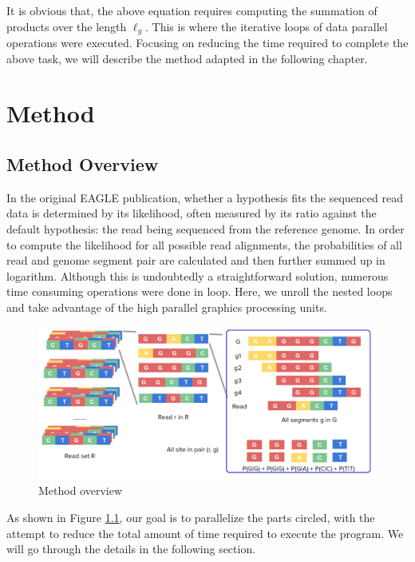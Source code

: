 \documentclass{PHlab-thesis}
\begin{document}
It is obvious that, the above equation requires computing the summation of products over the length $\ell_g$. This is where the iterative loops of data parallel operations were executed. Focusing on reducing the time required to complete the above task, we will describe the method adapted in the following chapter.

\chapter{Method}
\section{Method Overview}
In the original EAGLE publication, whether a hypothesis fits the sequenced read data is determined by its likelihood, often measured by its ratio against the default hypothesis: the read being sequenced from the reference genome. In order to compute the likelihood for all possible read alignments, the probabilities of all read and genome segment pair are calculated and then further summed up in logarithm. Although this is undoubtedly a straightforward solution, numerous time consuming operations were done in loop. Here, we unroll the nested loops and take advantage of the high parallel graphics processing units. 


\begin{figure}
	\centering
	\includegraphics[scale=0.3]{figures/overview.png}
	\caption{Method overview}
	\label{fig:overview} %
\end{figure}

As shown in Figure \ref{fig:overview}, our goal is to parallelize the parts circled, with the attempt to reduce the total amount of time required to execute the program. We will go through the details in the following section.
\end{document}
